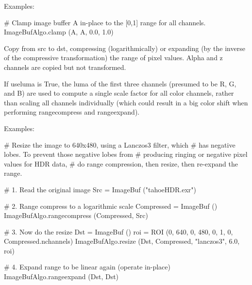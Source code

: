 \smallskip
\noindent Examples:
\begin{code}
    # Clamp image buffer A in-place to the [0,1] range for all channels.
    ImageBufAlgo.clamp (A, A, 0.0, 1.0)
\end{code}
\apiend


 
 

Copy from {\cf src} to {\cf dst}, compressing (logarithmically) or expanding
(by the inverse of the compressive transformation) the range of pixel
values.  Alpha and z channels are copied but not transformed.

If {\cf useluma} is {\cf True}, the luma of the first three channels (presumed
to be R, G, and B) are used to compute a single scale factor for all
color channels, rather than scaling all channels individually (which
could result in a big color shift when performing {\cf rangecompress}
and {\cf rangeexpand}).

\smallskip
\noindent Examples:
\begin{code}
    # Resize the image to 640x480, using a Lanczos3 filter, which
    # has negative lobes. To prevent those negative lobes from
    # producing ringing or negative pixel values for HDR data,
    # do range compression, then resize, then re-expand the range.

    # 1. Read the original image
    Src = ImageBuf ("tahoeHDR.exr")

    # 2. Range compress to a logarithmic scale
    Compressed = ImageBuf ()
    ImageBufAlgo.rangecompress (Compressed, Src)

    # 3. Now do the resize
    Dst = ImageBuf ()
    roi = ROI (0, 640, 0, 480, 0, 1, 0, Compressed.nchannels)
    ImageBufAlgo.resize (Dst, Compressed, "lanczos3", 6.0, roi)

    # 4. Expand range to be linear again (operate in-place)
    ImageBufAlgo.rangeexpand (Dst, Dst)
\end{code}
\apiend


 

